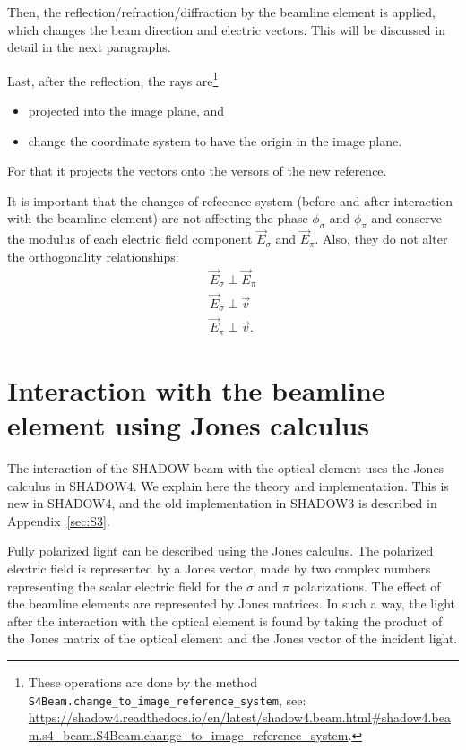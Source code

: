 \documentclass{iucr}
\begin{document}
Then, the reflection/refraction/diffraction by the beamline element is applied, which changes the beam direction and electric vectors.
This will be discussed in detail in the next paragraphs.

Last, after the reflection, the rays are\footnote{
These operations are done by the method {\tt S4Beam.change\_to\_image\_reference\_system}, see: {\tiny \url{https://shadow4.readthedocs.io/en/latest/shadow4.beam.html#shadow4.beam.s4_beam.S4Beam.change_to_image_reference_system}}.
} 
\begin{itemize}
    \item projected into the image plane, and
    \item change the coordinate system to have the origin in the image plane.
\end{itemize}
For that it projects the  vectors onto the versors of the new reference. 


It is important that the changes of refecence system (before and after interaction with the beamline element)  are not affecting the phase $\phi_\sigma$ and $\phi_\pi$ and conserve the modulus of each electric field component $\vec{E}_\sigma$ and $\vec{E}_\pi$. Also, they do not alter the orthogonality relationships:
\begin{eqnarray}
\label{ortho}
\vec{E}_\sigma \perp \vec{E}_\pi \nonumber \\
\vec{E}_\sigma \perp \vec{v} \nonumber \\
\vec{E}_\pi \perp \vec{v}.
\end{eqnarray}


\section{Interaction with the beamline element using Jones calculus}
\label{sec:S4}

The interaction of the SHADOW beam with the optical element  uses the Jones calculus \cite{Jones1941a, Jones1941b} in SHADOW4. We explain here the theory and implementation. This is new in SHADOW4, and the old implementation in SHADOW3 is described in Appendix~\ref{sec:S3}.

Fully polarized light can be described using the Jones calculus. The polarized electric field is represented by a Jones vector, made by two complex numbers representing the scalar electric field for the $\sigma$ and $\pi$ polarizations. 
The effect of the beamline elements are represented by Jones matrices.
In such a way, the light after the interaction with the optical element is found by taking the product of the Jones matrix of the optical element and the Jones vector of the incident light.
\end{document}
